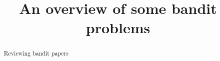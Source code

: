 \documentclass[letterpaper]{article}
\title{An overview of some bandit problems}
\author{} %
\begin{document}
\maketitle

\begin{abstract}
Reviewing bandit papers
\end{abstract}


%


\appendix
\end{document}
